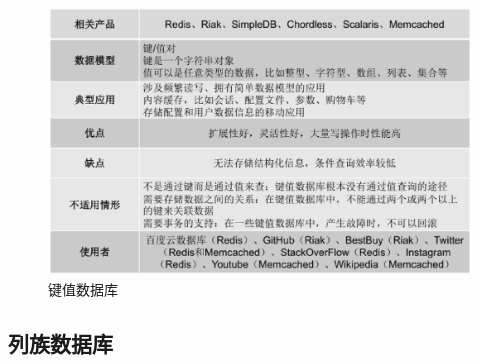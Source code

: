\documentclass{article}
\begin{document}
\begin{large}
  \begin{figure}[h]
    \centering
    \includegraphics[scale=0.5]{4.eps}
    \caption{键值数据库}
  \end{figure}

  \subsection{列族数据库}
\end{large}
\end{document}
